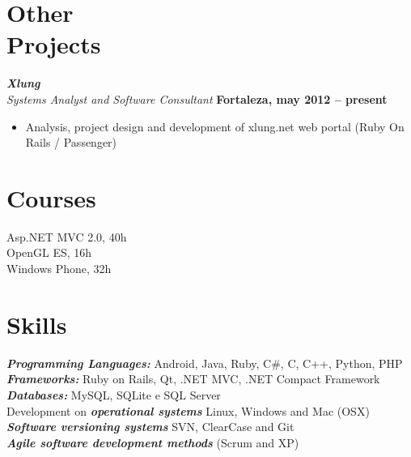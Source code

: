\documentclass[margin, 10pt]{res} %
\begin{document}
\begin{resume}
\section{Other \\ Projects}

{\sl\bf Xlung} \\
{\sl Systems Analyst and Software Consultant} \hfill {\bf Fortaleza, may 2012 -- present}
\begin{itemize} \itemsep -2pt 
\item Analysis, project design and development of xlung.net web portal (Ruby On Rails / Passenger)
\end{itemize} 

\section{Courses}
Asp.NET MVC 2.0, 40h \\
OpenGL ES, 16h \\
Windows Phone, 32h


\section{Skills}
{\sl\bf Programming Languages:}  Android, Java, Ruby, C\#, C, C++, Python, PHP \\
{\sl\bf Frameworks:} Ruby on Rails, Qt, .NET MVC, .NET Compact Framework \\
{\sl\bf Databases:} MySQL, SQLite e SQL Server \\
Development on {\sl\bf operational systems} Linux, Windows and Mac (OSX) \\
{\sl\bf Software versioning systems} SVN, ClearCase and Git \\
{\sl\bf Agile software development methods} (Scrum and XP) \\



\end{resume}
\end{document}
